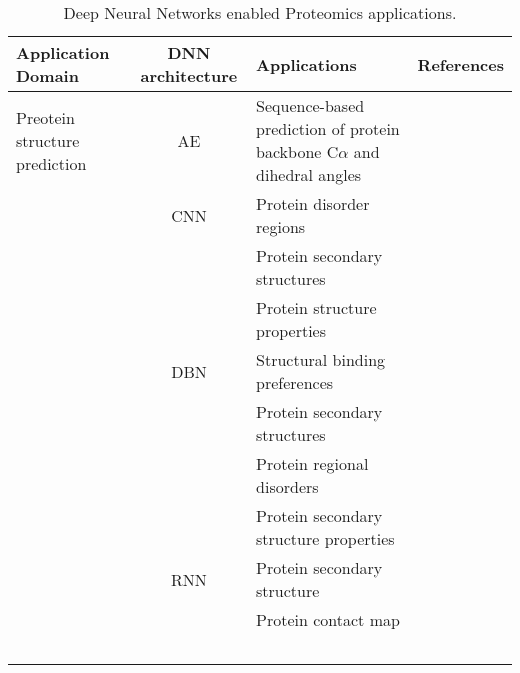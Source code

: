 \begin{table}[h!]
\centering
\begin{tabular}{|| l | c | l | l ||}
    \hline
    Application Domain & DNN architecture & Applications & References\\
    \hline \hline
    Preotein structure prediction & AE & Sequence-based prediction of protein backbone C$\alpha$ and dihedral angles & \\
    & CNN & Protein disorder regions & \\
    &     & Protein secondary structures & \\
    &     & Protein structure properties & \\
    & DBN & Structural binding preferences & \\
    &     & Protein secondary structures & \\
    &     & Protein regional disorders & \\
    &     & Protein secondary structure properties & \\
    & RNN & Protein secondary structure & \\
    &     & Protein contact map & \\
    \
    \hline \hline
\end{tabular}
\caption{Deep Neural Networks enabled Proteomics applications.}
\label{tab:PS-DNN}
\end{table}